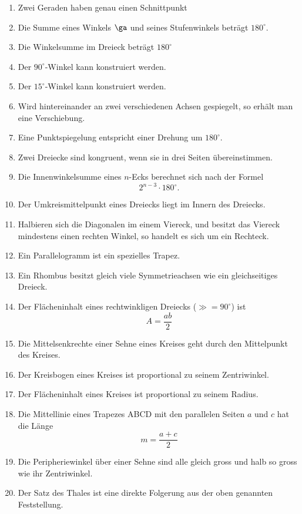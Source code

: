 \documentclass[%
11pt,%
twoside,%
titlepage,%
german,%
headsepline%
]{scrartcl}
\begin{document}
\begin{enumerate}
\item Zwei Geraden haben genau einen Schnittpunkt
\item Die Summe eines Winkels $\ga$ und seines Stufenwinkels betr\"agt $180^\circ $.
\item Die Winkelsumme im Dreieck betr\"agt $180^\circ $
\item Der $90^\circ $-Winkel kann konstruiert werden.
\item Der $15^\circ $-Winkel kann konstruiert werden.
\item Wird hintereinander an zwei verschiedenen Achsen gespiegelt, so erh\"alt man eine Verschiebung.
\item Eine Punktspiegelung entspricht einer Drehung um $180^\circ $.
\item Zwei Dreiecke sind kongruent, wenn sie in drei Seiten \"ubereinstimmen.
\item Die Innenwinkelsumme eines $n$-Ecks berechnet sich nach der Formel
$$2^{n-3}\cdot180^\circ .$$
\item Der Umkreismittelpunkt eines Dreiecks liegt im Innern des Dreiecks.
\item Halbieren sich die Diagonalen im einem Viereck, und besitzt das Viereck mindestens einen rechten Winkel, so handelt es sich um ein Rechteck.
\item Ein Parallelogramm ist ein spezielles Trapez.
\item Ein Rhombus besitzt gleich viele Symmetrieachsen wie ein gleichseitiges Dreieck.
\item Der Fl\"acheninhalt eines rechtwinkligen Dreiecks ($\gg=90^\circ $) ist
$$A=\frac{ab}{2}$$
\item Die Mittelsenkrechte einer Sehne eines Kreises geht durch den Mittelpunkt des Kreises.
\item Der Kreisbogen eines Kreises ist proportional zu seinem Zentriwinkel.
\item Der Fl\"acheninhalt eines Kreises ist proportional zu seinem Radius.
\item Die Mittellinie eines Trapezes ABCD mit den parallelen Seiten $a$ und $c$ hat die L\"ange
$$m=\frac{a+c}{2}$$
\item Die Peripheriewinkel \"uber einer Sehne sind alle gleich gross und halb so gross wie ihr Zentriwinkel.
\item Der Satz des Thales ist eine direkte Folgerung aus der oben genannten Feststellung.
\end{enumerate}
\end{document}
